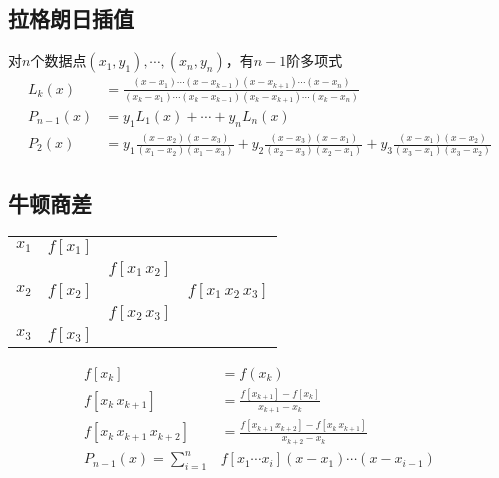 \documentclass[twocolumn]{article}
\begin{document}
\subsection{拉格朗日插值}
对$n$个数据点$(x_1,y_1),\cdots,(x_n,y_n)$，有$n-1$阶多项式
\begin{align*}
    L_k(x)     & =\frac{(x-x_1)\cdots(x-x_{k-1})(x-x_{k+1})\cdots(x-x_n)}{(x_k-x_1)\cdots(x_k-x_{k-1})(x_k-x_{k+1})\cdots(x_k-x_n)}                      \\
    P_{n-1}(x) & =y_1L_1(x)+\cdots+y_nL_n(x)                                                                                                             \\
    P_2(x)     & =y_1\frac{(x-x_2)(x-x_3)}{(x_1-x_2)(x_1-x_3)}+y_2\frac{(x-x_3)(x-x_1)}{(x_2-x_3)(x_2-x_1)}+y_3\frac{(x-x_1)(x-x_2)}{(x_3-x_1)(x_3-x_2)}
\end{align*}

\subsection{牛顿商差}
\noindent
\begin{minipage}{0.42\linewidth}
    \begin{center}
        \begin{tabular}{c|ccc}
            $x_1$ & $f[x_1]$ &                 &                        \\
                  &          & $f[x_1 \, x_2]$ &                        \\
            $x_2$ & $f[x_2]$ &                 & $f[x_1 \, x_2 \, x_3]$ \\
                  &          & $f[x_2 \, x_3]$ &                        \\
            $x_3$ & $f[x_3]$ &                 &
        \end{tabular}
    \end{center}
\end{minipage}
\begin{minipage}{0.5\linewidth}
    \begin{align*}
        f[x_k]                       & =f(x_k)                                                      \\
        f[x_k \, x_{k+1}]            & =\frac{f[x_{k+1}]-f[x_k]}{x_{k+1}-x_k}                       \\
        f[x_k \, x_{k+1} \, x_{k+2}] & =\frac{f[x_{k+1} \, x_{k+2}]-f[x_k \, x_{k+1}]}{x_{k+2}-x_k} \\
        P_{n-1}(x)=\sum_{i=1}^n      & f[x_1\cdots x_i](x-x_1)\cdots(x-x_{i-1})
    \end{align*}
\end{minipage}
\end{document}
